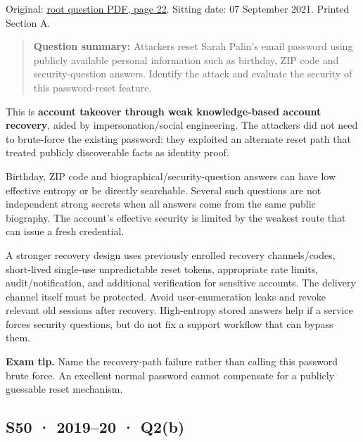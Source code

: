 \documentclass[11pt,a4paper]{article}
\begin{document}
Original: \href{../../CSE405-Security_Merged.pdf\#page=22}{root question PDF,\allowbreak{} page 22}. Sitting date: 07 September 2021. Printed Section A.



\begin{quote}\small

\textbf{Question summary:} Attackers reset Sarah Palin’s email password using publicly available personal information such as birthday,\allowbreak{} ZIP code and security-question answers. Identify the attack and evaluate the security of this password-reset feature.



\end{quote}

This is \textbf{account takeover through weak knowledge-based account recovery},\allowbreak{} aided by impersonation/\allowbreak{}social engineering. The attackers did not need to brute-force the existing password: they exploited an alternate reset path that treated publicly discoverable facts as identity proof.


Birthday,\allowbreak{} ZIP code and biographical/\allowbreak{}security-question answers can have low effective entropy or be directly searchable. Several such questions are not independent strong secrets when all answers come from the same public biography. The account’s effective security is limited by the weakest route that can issue a fresh credential.


A stronger recovery design uses previously enrolled recovery channels/\allowbreak{}codes,\allowbreak{} short-lived single-use unpredictable reset tokens,\allowbreak{} appropriate rate limits,\allowbreak{} audit/\allowbreak{}notification,\allowbreak{} and additional verification for sensitive accounts. The delivery channel itself must be protected. Avoid user-enumeration leaks and revoke relevant old sessions after recovery. High-entropy stored answers help if a service forces security questions,\allowbreak{} but do not fix a support workflow that can bypass them.



{\color{ForestGreen}\textbf{Exam tip.} Name the recovery-path failure rather than calling this password brute force. An excellent normal password cannot compensate for a publicly guessable reset mechanism.}




\clearpage
\subsection{S50 · 2019–20 · Q2(b)}\label{s50}
\end{document}
